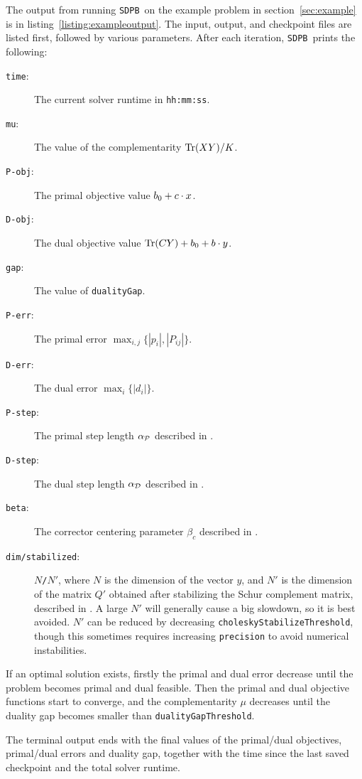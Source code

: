 \documentclass[12pt]{article}
\numberwithin{equation}{section}
\newcommand\SDPB{\texttt{SDPB}}
\begin{document}
The output from running \SDPB\ on the example problem in section~\ref{sec:example} is in listing~\ref{listing:exampleoutput}.  The input, output, and checkpoint files are listed first, followed by various parameters.  After each iteration, \SDPB\ prints the following:
\begin{description}
\item[\texttt{time}:] The current solver runtime in \texttt{hh:mm:ss}.
\item[\texttt{mu}:] The value of the complementarity $\Tr(XY)/K$.
\item[\texttt{P-obj}:] The primal objective value $b_0+c\.x$.
\item[\texttt{D-obj}:] The dual objective value $\Tr(CY)+b_0+b\.y$.
\item[\texttt{gap}:] The value of \texttt{dualityGap}.
\item[\texttt{P-err}:] The primal error $\max_{i,j}\{|p_i|,|P_{ij}|\}$.
\item[\texttt{D-err}:] The dual error $\max_i\{|d_i|\}$.
\item[\texttt{P-step}:] The primal step length $\alpha_\cP$ described in \cite{DSD}.
\item[\texttt{D-step}:] The dual step length $\alpha_\cD$ described in \cite{DSD}.
\item[\texttt{beta}:]  The corrector centering parameter $\beta_c$ described in \cite{DSD}.
\item[\texttt{dim/stabilized}:] $N$\texttt{/}$N'$, where $N$ is the dimension of the vector $y$, and $N'$ is the dimension of the matrix $Q'$ obtained after stabilizing the Schur complement matrix, described in \cite{DSD}.  A large $N'$ will generally cause a big slowdown, so it is best avoided.  $N'$ can be reduced by decreasing \texttt{choleskyStabilizeThreshold}, though this sometimes requires increasing \texttt{precision} to avoid numerical instabilities.
\end{description}

If an optimal solution exists, firstly the primal and dual error decrease until the problem becomes primal and dual feasible.  Then the primal and dual objective functions start to converge, and the complementarity $\mu$ decreases until the duality gap becomes smaller than \texttt{dualityGapThreshold}.

The terminal output ends with the final values of the primal/dual objectives, primal/dual errors and duality gap, together with the time since the last saved checkpoint and the total solver runtime.
\end{document}
